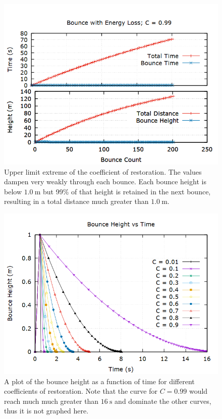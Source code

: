 \documentclass[aps,prl,twocolumn,superscriptaddress]{revtex4-1}
\begin{document}
\begin{figure}[htbp]
 	\begin{center}
 		\includegraphics[scale=0.27]{099.png} 
  		\caption{Upper limit extreme of the coefficient of restoration. The values dampen very weakly through each bounce. Each bounce height is below $\SI{1.0}{\m}$ but 99\% of that height is retained in the next bounce, resulting in a total distance much greater than $\SI{1.0}{\m}$.}
  		\label{gr:0.99}
 	\end{center}
\end{figure}

\begin{figure}[htbp]
 	\begin{center}
 		\includegraphics[scale=0.3]{HvT.png} 
  		\caption{A plot of the bounce height as a function of time for different coefficients of restoration. Note that the curve for $C = 0.99$ would reach much much greater than $\SI{16}{\s}$ and dominate the other curves, thus it is not graphed here.}
  		\label{gr:HvT}
 	\end{center}
\end{figure}
\end{document}
